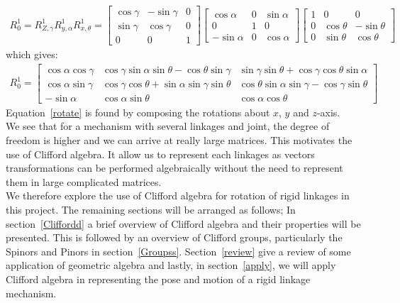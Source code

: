 \documentclass[12pt,onecolumn,letterpaper]{article} %
\begin{document}
\begin{align*}
R^1_0=R^1_{Z,\gamma}R^1_{y,\alpha}R^1_{x,\theta}=
\left [
\begin{array}{llr}
\cos\gamma & -\sin\gamma & 0 \\
\sin\gamma & \cos\gamma  & 0 \\
0 & 0 & 1
\end{array} \right]
\left [
\begin{array}{llr}
\cos\alpha & 0 & \sin\alpha \\
0 & 1 & 0 \\
-\sin\alpha & 0 & \cos\alpha
\end{array} \right]
\left [
\begin{array}{llr}
1 & 0 & 0 \\
0 & \cos\theta & -\sin\theta \\
0 & \sin\theta & \cos\theta
\end{array} \right]
\end{align*}
which gives:
\begin{align}
R^1_0=
\left [
\begin{array}{llr}
\cos\alpha \cos\gamma & \cos\gamma\sin\alpha\sin\theta-\cos\theta\sin\gamma & \sin\gamma\sin\theta+\cos\gamma\cos\theta\sin\alpha \\
\cos\alpha\sin\gamma & \cos\gamma\cos\theta+\sin\alpha\sin\gamma\sin\theta  & \cos\theta\sin\alpha\sin\gamma-\cos\gamma\sin\theta \\
-\sin\alpha & \cos\alpha\sin\theta & \cos\alpha\cos\theta
\end{array} \right]
\label{rotate}
\end{align}
Equation~\ref{rotate} is found by composing the rotations about $x$, $y$ and $z$-axis.\\
We see that for a mechanism with several linkages and joint, the degree of freedom is higher and we can arrive at really large matrices. This motivates the use of Clifford algebra. It allow us to represent each linkages as vectors transformations can be performed algebraically without the need to represent them in large complicated matrices.\\ We therefore explore the use of Clifford algebra for rotation of rigid linkages in this project. The remaining sections will be arranged as follows; In section~\ref{Cliffordd} a brief overview of Clifford algebra and their properties will be presented. This is followed by an overview of Clifford groups, particularly the Spinors and Pinors in section~\ref{Groupss}. Section~\ref{review} give 
a review of some application of geometric algebra and lastly, in section~\ref{apply}, we will apply Clifford algebra in representing the pose and motion of a rigid linkage mechanism.
\end{document}
